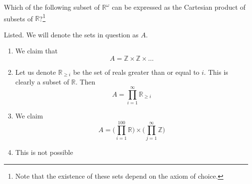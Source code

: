   \begin{exercise} 
    Which of the following subset of $\mathbb{R}^\omega$ can be expressed as the Cartesian product of subsets of $\mathbb{R}$?\footnote{Note that the existence of these sets depend on the axiom of choice.}
  \end{exercise}
  \begin{solution}
    Listed. We will denote the sets in question as $A$. 
    \begin{enumerate}
      \item We claim that 
        \begin{equation}
          A = \mathbb{Z} \times \mathbb{Z} \times \ldots
        \end{equation}
      \item Let us denote $\mathbb{R}_{\geq i}$ be the set of reals greater than or equal to $i$. This is clearly a subset of $\mathbb{R}$. Then 
        \begin{equation}
          A = \prod_{i=1}^\infty \mathbb{R}_{\geq i}
        \end{equation}
      \item We claim 
        \begin{equation}
          A = \bigg( \prod_{i=1}^{100} \mathbb{R} \bigg) \times \bigg( \prod_{j=1}^\infty \mathbb{Z} \bigg)
        \end{equation}
      \item This is not possible
    \end{enumerate}
    
  \end{solution}

